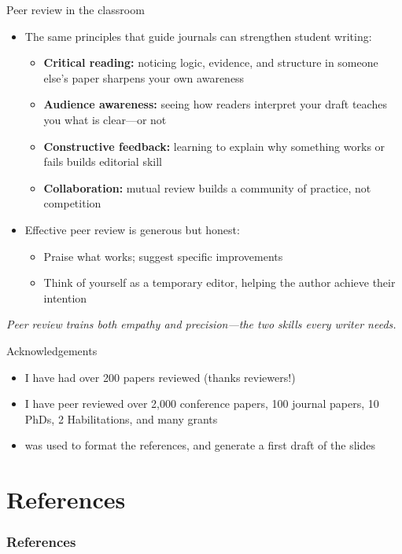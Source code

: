 \documentclass[aspectratio=169]{beamer}
\begin{document}
\begin{frame}{Peer review in the classroom}
\begin{itemize}
  \item The same principles that guide journals can strengthen student writing:
    \begin{itemize}
      \item \textbf{Critical reading:} noticing logic, evidence, and structure in someone else's paper sharpens your own awareness
      \item \textbf{Audience awareness:} seeing how readers interpret your draft teaches you what is clear—or not
      \item \textbf{Constructive feedback:} learning to explain why something works or fails builds editorial skill
      \item \textbf{Collaboration:} mutual review builds a community of practice, not competition
    \end{itemize}
  \item Effective peer review is generous but honest:
    \begin{itemize}
      \item Praise what works; suggest specific improvements
      \item Think of yourself as a temporary editor, helping the author achieve their intention
    \end{itemize}
\end{itemize}
\textit{Peer review trains both empathy and precision—the two skills every writer needs.}
\end{frame}







\begin{frame}{Acknowledgements}

  \begin{itemize}
 \item I have had over 200 papers reviewed (thanks reviewers!)
 \item I have peer reviewed over 2,000 conference papers, 100 journal papers, 10 PhDs, 2 Habilitations, and many grants
  \item \textcite{openai-chatgpt-2025-03-14} was used to format the references, and generate a first draft of the slides
  \aicheck
  \end{itemize}
  
\end{frame}



\section{References}
\begin{frame}[allowframebreaks]
\frametitle{References}
\printbibliography[heading=none]
\end{frame}
\end{document}
